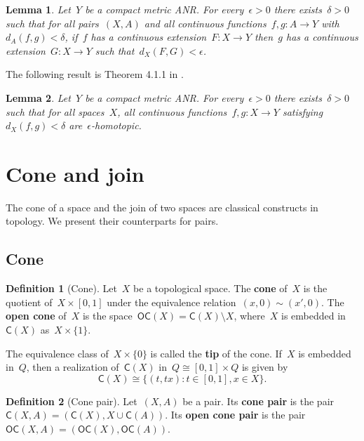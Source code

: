 \documentclass[english,11pt]{article}
\theoremstyle{plain}
\newtheorem{lemma}{Lemma}[section]
\theoremstyle{remark}
\theoremstyle{definition}
\newtheorem{definition}{Definition}[section]
\newcommand{\C}[1]{\mathsf{C}(#1)}%
\newcommand{\OC}[1]{\mathsf{OC}(#1)}%
\begin{document}
\begin{lemma} \label{lem_ANR_extension}
Let~$Y$ be a compact metric ANR. For every~$\epsilon>0$ there exists~$\delta>0$ such that for all pairs~$(X,A)$ and all continuous functions~$f,g:A\to Y$ with~$d_{A}(f,g)<\delta$, if~$f$ has a continuous extension~$F:X\to Y$ then~$g$ has a continuous extension~$G:X\to Y$ such that~$d_{X}(F,G)<\epsilon$.
\end{lemma}

The following result is Theorem 4.1.1 in \cite{Mill01}.
\begin{lemma}\label{lem_close_homotopic}
Let~$Y$ be a compact metric ANR. For every~$\epsilon>0$ there exists~$\delta>0$ such that for all spaces~$X$, all continuous functions~$f,g:X\to Y$ satisfying~$d_X(f,g)<\delta$ are~$\epsilon$-homotopic.
\end{lemma}




\section{Cone and join}\label{sec_cone_join}
The cone of a space and the join of two spaces are classical constructs in topology. We present their counterparts for pairs.

\subsection{Cone}\label{sec_cone}
\begin{definition}[Cone]
Let~$X$ be a topological space. The \textbf{cone} of~$X$ is
the quotient of~$X\times [0,1]$ under the equivalence relation~$(x,0)\sim (x',0)$. The \textbf{open cone} of~$X$ is the space~$\OC X=\C X\setminus X$, where~$X$ is embedded in~$\C{X}$ as~$X\times \{1\}$.
\end{definition}
The equivalence class of~$X\times\{0\}$ is called the \textbf{tip} of the cone. If~$X$ is embedded in~$Q$, then a realization of~$\C X$ in~$Q\cong[0,1]\times Q$ is given by
\begin{equation*}
\C X\cong\{(t,t x):t\in[0,1],x\in X\}.
\end{equation*}


\begin{definition}[Cone pair]
Let~$(X,A)$ be a pair. Its \textbf{cone pair} is the pair~$\C{X,A}=(\C X,X\cup\C A)$. Its \textbf{open cone pair} is the pair~$\OC{X,A}=(\OC{X},\OC{A})$.
\end{definition}
\end{document}
